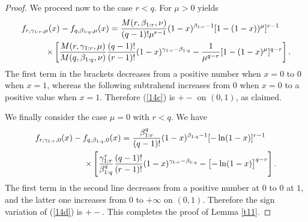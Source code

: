 \documentclass[10pt,a4paper]{amsart}
\begin{document}
\begin{proof}
We proceed now to the case $r<q$. For $\mu>0$ yields
\begin{eqnarray}
\lefteqn{f_{r, \gamma_{1:r}, \mu} (x) - f_{q, \beta_{1:q}, \mu} (x)
=  \frac{M(r,\beta_{1:r},\nu)}
{(q-1)!\mu^{r-1}}
(1-x)^{\beta_{1:r}-1} [1-(1-x))^\mu ]^{r-1}} \nonumber \\
& & \qquad \times \left[ 
 \frac{M(r,\gamma_{1:r},\mu)}{M(q,\beta_{1:q},\nu)}
\frac{(q-1)!}{(r-1)!}
(1-x)^{\gamma_{1:r}-\beta_{1:q}} - \frac{1}{\mu^{q-r}}
[1-(1-x)^\mu ]^{q-r} \right].
\label{14c}
\end{eqnarray}
The first term in the brackets decreases from a positive number when $x=0$ to $0$ when $x=1$, whereas the following subtrahend increases from $0$ when $x=0$ to a positive value when $x=1$. Therefore (\ref{14c}) is $+-$ on $(0,1)$, as claimed.

We finally consider the case $\mu=0$ with $r<q$. We have
\begin{eqnarray}
\lefteqn{f_{r, \gamma_{1:r}, 0} (x) - f_{q, \beta_{1:q},0} (x)
=  \frac{\beta_{1:r}^q}{(q-1)!}
(1-x)^{\beta_{1:q}-1} [-\ln(1-x)]^{r-1}} \nonumber \\
& & \qquad\qquad\quad \times \left[ \frac{\gamma_{1:r}^r}{\beta_{1:q}^q}
\frac{(q-1)!}{(r-1)!}
(1-x)^{\gamma_{1:r}-\beta_{1:q}} -
\bigl[-\ln (1-x) \bigr]^{q-r} \right].
\label{14d}
\end{eqnarray}
The first term in the second line decreases from a positive number at $0$ to $0$ at $1$, and the latter one increases from $0$ to $+\infty$
on $(0,1)$. Therefore the sign variation of (\ref{14d}) is $+-$. This completes the proof of Lemma \ref{t11}.
\end{proof}
\end{document}
